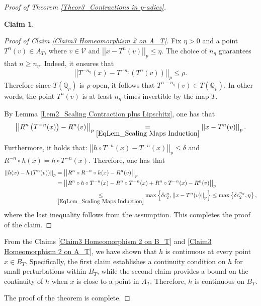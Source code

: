 \documentclass[10pt,a4paper]{amsart}
\newtheorem{claim}{Claim}
\begin{document}
\begin{proof}[Proof of Theorem \ref{Theor3_Contractions in p-adics}]
\begin{claim}
		\end{claim}
		
		\begin{proof}[Proof of Claim \ref{Claim3 Homeomorphism 2 on A_T}]
			Fix $  \eta  > 0$ and a point $T^{n} \left(  v  \right)  \in A_{T}$, where $v \in \mathcal{V}$ and $ \left| \left|  x - T^{n}(v)  \right|  \right|_{p} \le  \eta $. The choice of $n_{ \eta} $ guarantees that $n \ge n_{ \eta}$. Indeed, it ensures that  
			$$ \left| \left|  T^{-n_{ \eta}}(x) -  T^{- n_{ \eta}} \left(  T^{n}(v)  \right)   \right|  \right|_{p} \le \rho. $$
			Therefore since $T \left(  \mathbb{Q}_{p}  \right) $ is $\rho$-open, it follows that  $T^{n - n_{ \eta}}(v) \in T \left(  \mathbb{Q}_{p}  \right) $. In other words, the point $T^{n} \left(  v  \right) $ is at least $n_{ \eta}$-times invertible by the map $T$. 
			
			
			By Lemma \ref{Lem2_Scaling Contraction plus Lipschitz}, one has that
			$$  \left| \left|  R^{n} \left(  T^{-n}(x)  \right)  - R^{n}(v)  \right|  \right|_{p}   \underset{\eqref{EqLem_Scaling Maps Induction}}{=}    \left| \left|  x - T^{n}(v)  \right|  \right|_{p} . $$ 
			Furthermore, it holds that: $  \left| \left|  h\circ T^{-n}(x)  - T^{-n}(x)  \right|  \right|_{p} \le \delta$ and $ R^{-n}\circ h(x)  = h\circ T^{-n} (x) $.
			Therefore,  one has that
			\begin{align*}
				\left| \left|  h(x) - h \left(  T^{n}(v)  \right)   \right|  \right|_{p}  & =    \left| \left|  R^{n}\circ R^{-n} \circ h(x) - R^{n}(v)  \right|  \right|_{p}  \\ 
				&=    \left| \left|  R^{n}\circ h \circ T^{-n}(x) - R^{n}\circ T^{-n} (x) + R^{n} \circ T^{-n}(x)   - R^{n}(v)  \right|  \right|_{p}  \\ 
				& \underset{\eqref{EqLem_Scaling Maps Induction}}{\le}   \max  \left\{  \delta  c_{2}^{n},    \left| \left|  x - T^{n}(v)  \right|  \right|_{p}  \right\}     \le   \max \left\{  \delta  c_{2}^{n_{ \eta}} ,    \eta  \right\} , 
			\end{align*}
			where the last inequality follows from the assumption. 
			This completes the proof of the claim. 
			
		\end{proof}
		
		
		From the Claims \ref{Claim3 Homeomorphism 2 on B_T} and \ref{Claim3 Homeomorphism 2 on A_T}, we have shown that $h$ is continuous at every point $x \in B_{T}$. Specifically, the first claim establishes a continuity condition on $h$ for small perturbations within $B_{T}$, while the second claim provides a bound on the continuity of $h$ when $x$ is close to a point in $A_{T}$. Therefore, $h$ is continuous on $B_{T}$. 
		
		
		
		The proof of the theorem is complete. 
		
		
	\end{proof}
\end{document}
